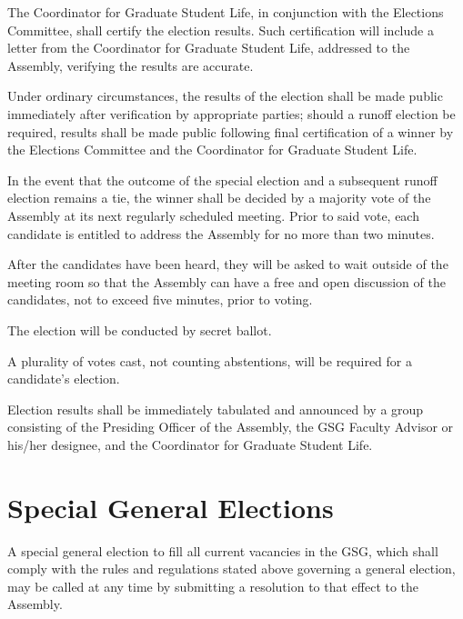 \begin{bylaws-number}
\begin{bylaws-number}
  \end{bylaws-number}
  \item The Coordinator for Graduate Student Life, in conjunction with the Elections Committee, shall certify the election results. Such certification will include a letter from the Coordinator for Graduate Student Life, addressed to the Assembly, verifying the results are accurate.
  \item Under ordinary circumstances, the results of the election shall be made public immediately after verification by appropriate parties; should a runoff election be required, results shall be made public following final certification of a winner by the Elections Committee and the Coordinator for Graduate Student Life.
  \item In the event that the outcome of the special election and a subsequent runoff election remains a tie, the winner shall be decided by a majority vote of the Assembly at its next regularly scheduled meeting. Prior to said vote, each candidate is entitled to address the Assembly for no more than two minutes.
  \item After the candidates have been heard, they will be asked to wait outside of the meeting room so that the Assembly can have a free and open discussion of the candidates, not to exceed five minutes, prior to voting.
  \item The election will be conducted by secret ballot.
  \item A plurality of votes cast, not counting abstentions, will be required for a candidate’s election.
  \item Election results shall be immediately tabulated and announced by a group consisting of the Presiding Officer of the Assembly, the GSG Faculty Advisor or his/her designee, and the Coordinator for Graduate Student Life.
\end{bylaws-number}

\section{Special General Elections}
A special general election to fill all current vacancies in the GSG, which shall comply with the rules and regulations stated above governing a general election, may be called at any time by submitting a resolution to that effect to the Assembly.
